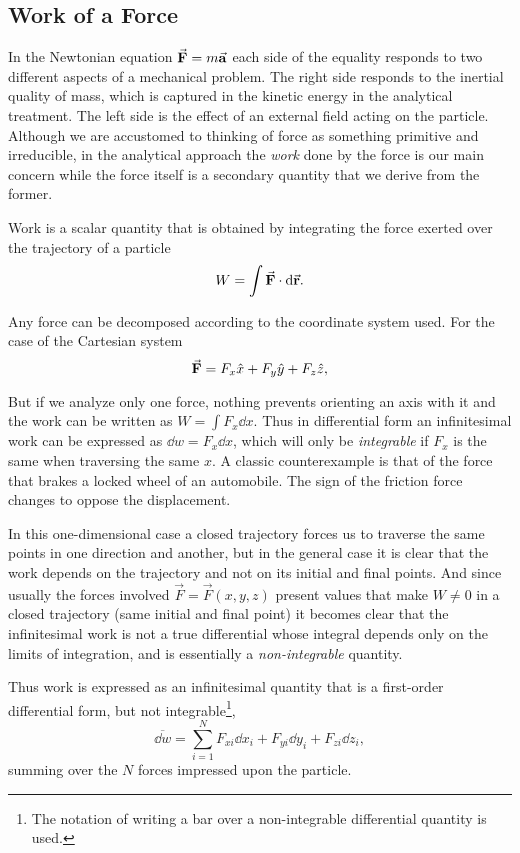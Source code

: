 \documentclass[12pt, spanish, a4paper, ]{article}
\begin{document}
\subsection{Work of a Force}
In the Newtonian equation \(\va{F}= m \va{a}\) each side of the equality responds to two different aspects of a mechanical problem.
The right side responds to the inertial quality of mass, which is captured in the kinetic energy in the analytical treatment.
The left side is the effect of an external field acting on the particle.
Although we are accustomed to thinking of force as something primitive and irreducible, in the analytical approach the \emph{work} done by the force is our main concern while the force itself is a secondary quantity that we derive from the former.

Work is a scalar quantity that is obtained by integrating the force exerted over the trajectory of a particle
\begin{equation}
	W= \int \va{F} \cdot \dd\va{r}.
\end{equation}

Any force can be decomposed according to the coordinate system used.
For the case of the Cartesian system
\begin{equation}
	\va{F}= F_x \hat{x}+ F_y \hat{y}+ F_z \hat{z},
\end{equation}

But if we analyze only one force, nothing prevents orienting an axis with it and the work can be written as \(W= \int F_x \dd x\).
Thus in differential form an infinitesimal work can be expressed as \(\dd w= F_x \dd x\), which will only be \emph{integrable} if \(F_x\) is the same when traversing the same \(x\).
A classic counterexample is that of the force that brakes a locked wheel of an automobile.
The sign of the friction force changes to oppose the displacement.

In this one-dimensional case a closed trajectory forces us to traverse the same points in one direction and another, but in the general case it is clear that the work depends on the trajectory and not on its initial and final points.
And since usually the forces involved \(\vec{F}= \vec{F}(x,y,z)\) present values that make \(W \neq 0 \) in a closed trajectory (same initial and final point) it becomes clear that the infinitesimal work is not a true differential whose integral depends only on the limits of integration, and is essentially a \emph{non-integrable} quantity.

Thus work is expressed as an infinitesimal quantity that is a first-order differential form, but not integrable\footnote{The notation of writing a bar over a non-integrable differential quantity is used.}, 
\begin{equation}\label{Lanczos17.2}
	\overline{\dd w}= \displaystyle\sum_{i=1}^{N} F_{xi} \dd x_i+ F_{yi} \dd y_i+ F_{zi} \dd z_i,
	\tag{Lanczos 17.2}
\end{equation}
summing over the \(N\) forces impressed upon the particle.
\end{document}
